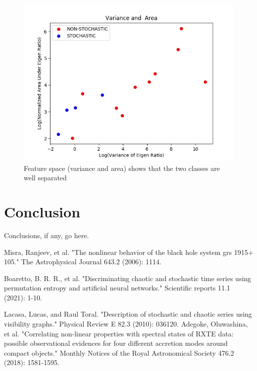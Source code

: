 \documentclass[10pt,conference]{IEEEtran}
\begin{document}
\begin{figure}
    \centering
    \includegraphics[width=.9\linewidth]{variance_area.jpg}
    \caption{Feature space (variance and area) shows that the two classes are well separated}
    \label{figure11}
\end{figure}

\section{Conclusion}
Conclusions, if any, go here.



\begin{thebibliography}{1}

Misra, Ranjeev, et al. "The nonlinear behavior of the black hole system grs 1915+ 105." The Astrophysical Journal 643.2 (2006): 1114.

Boaretto, B. R. R., et al. "Discriminating chaotic and stochastic time series using permutation entropy and artificial neural networks." Scientific reports 11.1 (2021): 1-10.

  Lacasa, Lucas, and Raul Toral. "Description of stochastic and chaotic series using visibility graphs." Physical Review E 82.3 (2010): 036120.
Adegoke, Oluwashina, et al. "Correlating non-linear properties with spectral states of RXTE data: possible observational evidences for four different accretion modes around compact objects." Monthly Notices of the Royal Astronomical Society 476.2 (2018): 1581-1595.

\end{thebibliography}
\end{document}
